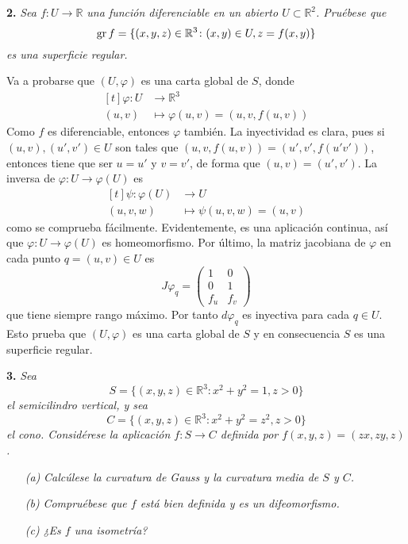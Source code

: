 \documentclass[12pt]{report}
\newcommand{\R}{\mathbb R}
\begin{document}
\vspace{4mm}
\textbf{2. } \textit{Sea $f \colon U \to \R$ una función diferenciable en un abierto $U \subset \R^2$. Pruébese que
\[\textup{gr} \, f = \{(x,y,z) \in \R^3 \colon (x,y) \in U, z = f(x,y)\}\]
es una superficie regular.}

\vspace{2mm}
Va a probarse que $(U,\varphi)$ es una carta global de $S$, donde
\[
\begin{aligned}[t]
\varphi \colon U &\longrightarrow \R^3 \\
(u,v) &\longmapsto \varphi(u,v) = (u,v,f(u,v))
\end{aligned}
\]
Como $f$ es diferenciable, entonces $\varphi$ también. La inyectividad es clara, pues si $(u,v),(u',v') \in U$ son tales que $(u,v,f(u,v)) = (u',v',f(u'v'))$, entonces tiene que ser $u = u'$ y $v = v'$, de forma que $(u,v) = (u',v')$. La inversa de $\varphi \colon U \to \varphi(U)$ es
\[
\begin{aligned}[t]
\psi \colon \varphi(U) &\longrightarrow U \\
(u,v,w) &\longmapsto \psi(u,v,w) = (u,v)
\end{aligned}
\]
como se comprueba fácilmente. Evidentemente, es una aplicación continua, así que $\varphi \colon U \to \varphi(U)$ es homeomorfismo. Por último, la matriz jacobiana de $\varphi$ en cada punto $q = (u,v) \in U$ es
\[J\varphi_q = \begin{pmatrix}
    1 & 0 \\
    0 & 1 \\
    f_u & f_v
\end{pmatrix}\]
que tiene siempre rango máximo. Por tanto $d\varphi_q$ es inyectiva para cada $q \in U$. Esto prueba que $(U,\varphi)$ es una carta global de $S$ y en consecuencia $S$ es una superficie regular.

\vspace{4mm}
\textbf{3. } \textit{Sea 
\[S = \{(x,y,z) \in \R^3 \colon x^2+y^2=1, z>0\}\] el semicilindro vertical, y sea 
\[C = \{(x,y,z) \in \R^3 \colon x^2+y^2=z^2,z>0\}
\] el cono. Considérese la aplicación $f \colon S \to C$ definida por $f(x,y,z) = (zx,zy,z)$.}

\begin{itemize}
    \item[\textit{(a)}] \textit{Calcúlese la curvatura de Gauss y la curvatura media de $S$ y $C$.}
    \item[\textit{(b)}] \textit{Compruébese que $f$ está bien definida y es un difeomorfismo.}
    \item[\textit{(c)}] \textit{¿Es $f$ una isometría?}
\end{itemize}
\end{document}
